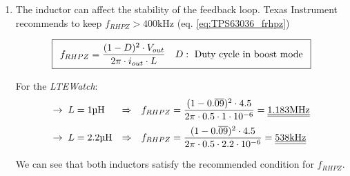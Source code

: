 \documentclass[report.tex]{subfiles}
\begin{document}
\begin{enumerate}
\textit{LTEWatch} peak current with recommanded inductors from the table \ref{fig:TPS63036_output_capacitor_filter}:

$$
I_{PEAK} = I_{BAT,DCHRG} + \dfrac{V_{BAT,EMPTY} \cdot D}{2 \cdot f \cdot L} = 0.5 + \dfrac{3.0 \cdot 0.\overline{09}}{1 \cdot 2\cdot 10^6 \cdot L}
$$

$$
\begin{array}{l c l}
\rightarrow \; L = 1\si{\micro\henry} & \Rightarrow & I_{PEAK} = \ddl{568\si{\milli\ampere}} \\
\rightarrow \; L = 2.2\si{\micro\henry} & \Rightarrow & I_{PEAK} = \ddl{531\si{\milli\ampere}}
\end{array}
$$

We can see that both inductors generate a very similar peak current around \SI{550}{\milli\ampere}, therefore the selected inductor specification should be:

$$
\boxed{\boxed{
\begin{array}{l}
\circ \; \SI{1}{\micro\henry} < L < \SI{2.2}{\micro\henry}\\[5pt]
\circ \; I_{L,SAT} > \SI{600}{\milli\ampere}
\end{array}}}
$$

\item The inductor can affect the stability of the feedback loop. Texas Instrument recommends to keep $f_{RHPZ} > 400 \si{\kilo\hertz}$ (eq. \ref{eq:TPS63036_frhpz})

\begin{equation}
\label{eq:TPS63036_frhpz}
\boxed{\begin{array}{l l}
f_{RHPZ} = \dfrac{(1-D)^2 \cdot V_{out}}{2 \pi \cdot i_{out} \cdot L} & D: \text{ Duty cycle in boost mode}
\end{array}}
\end{equation}

For the \textit{LTEWatch}:
$$
\begin{array}{l c l}
\rightarrow \; L = 1\si{\micro\henry} & \Rightarrow  & f_{RHPZ} = \dfrac{(1-0.\overline{09})^2 \cdot 4.5}{2 \pi \cdot 0.5 \cdot 1 \cdot 10^{-6}} = \ddl{1.183\si{\mega\hertz}} \\[10pt]
\rightarrow \; L = 2.2\si{\micro\henry} & \Rightarrow & f_{RHPZ} = \dfrac{(1-0.\overline{09})^2 \cdot 4.5}{2 \pi \cdot 0.5 \cdot 2.2 \cdot 10^{-6}} = \ddl{538\si{\kilo\hertz}}
\end{array}
$$

We can see that both inductors satisfy the recommended condition for $f_{RHPZ}$.


\end{enumerate}
\end{document}
